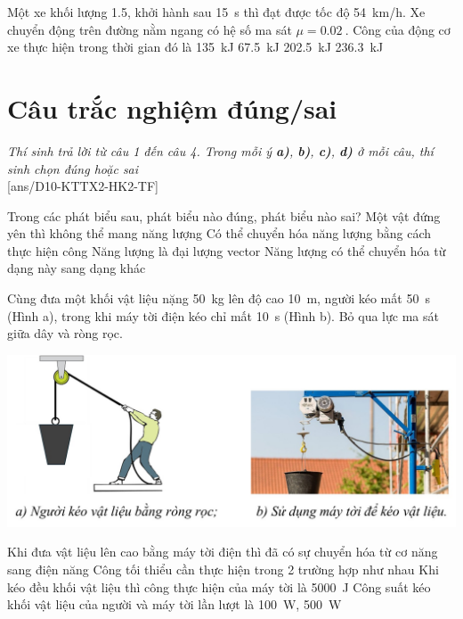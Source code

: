 \begin{ex}
	Một xe khối lượng \SI{1.5}{}, khởi hành sau \SI{15}{\second} thì đạt được tốc độ \SI{54}{\kilo\meter/\hour}. Xe chuyển động trên đường nằm ngang có hệ số ma sát $\mu =\SI{0.02}{}$. Công của động cơ xe thực hiện trong thời gian đó là
	\choice
	{\SI{135}{\kilo\joule}}
	{\SI{67.5}{\kilo\joule}}
	{\True \SI{202.5}{\kilo\joule}}
	{\SI{236.3}{\kilo\joule}}
	\loigiai{}
\end{ex}
\section{Câu trắc nghiệm đúng/sai} 
\textit{Thí sinh trả lời từ câu 1 đến câu 4. Trong mỗi ý \textbf{a)}, \textbf{b)}, \textbf{c)}, \textbf{d)} ở mỗi câu, thí sinh chọn đúng hoặc sai}
\setcounter{ex}{0}\\
[ans/D10-KTTX2-HK2-TF]
\begin{ex}
	Trong các phát biểu sau, phát biểu nào đúng, phát biểu nào sai?
	\choiceTF
	{Một vật đứng yên thì không thể mang năng lượng}
	{\True Có thể chuyển hóa năng lượng bằng cách thực hiện công}
	{Năng lượng là đại lượng vector}
	{\True Năng lượng có thể chuyển hóa từ dạng này sang dạng khác}
	\loigiai{}
\end{ex}
\begin{ex}
	Cùng đưa một khối vật liệu nặng \SI{50}{\kilogram} lên độ cao \SI{10}{\meter}, người kéo mất \SI{50}{\second} (Hình a), trong khi máy tời điện kéo chỉ mất \SI{10}{\second} (Hình b). Bỏ qua lực ma sát giữa dây và ròng rọc.
	\begin{center}
		\includegraphics[scale=0.45]{../figs/D10-KTTX2-HK2-1}
	\end{center}
	\choiceTF
	{Khi đưa vật liệu lên cao bằng máy tời điện thì đã có sự chuyển hóa từ cơ năng sang điện năng}
	{\True Công tối thiểu cần thực hiện trong 2 trường hợp như nhau}
	{\True Khi kéo đều khối vật liệu thì công thực hiện của máy tời là \SI{5000}{\joule}}
	{\True Công suất kéo khối vật liệu của người và máy tời lần lượt là \SI{100}{\watt}, \SI{500}{\watt}}
	\loigiai{}
\end{ex}
